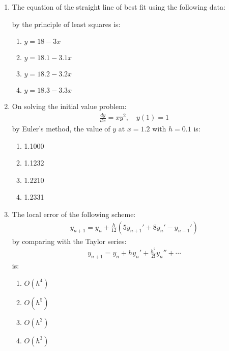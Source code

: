 \documentclass[journal,12pt,onecolumn]{IEEEtran}
\theoremstyle{remark}
\begin{document}
\begin{enumerate}
    \item The equation of the straight line of best fit using the following data:
    \begin{table}[h!]    
    \centering
    
    \end{table}
    by the principle of least squares is:
 \begin{multicols}{4}
    \begin{enumerate}
        \item $y = 18 - 3x$
        \item $y = 18.1 - 3.1x$
        \item $y = 18.2 - 3.2x$
        \item $y = 18.3 - 3.3x$
    \end{enumerate}
    \end{multicols}
    \item On solving the initial value problem:
    \begin{align}
    \frac{dy}{dx} = xy^2, \quad y(1) = 1
    \end{align}    
    by Euler's method, the value of $y$ at $x = 1.2$ with $h = 0.1$ is:
    \begin{multicols}{4}
    \begin{enumerate}
        \item 1.1000
        \item 1.1232
        \item 1.2210
        \item 1.2331    
    \end{enumerate}
   \end{multicols}
    \item The local error of the following scheme:
   \begin{align}
    y_{n+1} = y_n + \frac{h}{12} \left( 5y_{n+1}' + 8y_n' - y_{n-1}' \right)
    \end{align}   
    by comparing with the Taylor series:
    \begin{align}
    y_{n+1} = y_n + hy_n' + \frac{h^2}{2!} y_n'' + \cdots
    \end{align}
    is:
    \begin{multicols}{4}
    \begin{enumerate}
        \item $O(h^4)$
        \item $O(h^5)$
        \item $O(h^2)$
        \item $O(h^3)$
    \end{enumerate}
    \end{multicols}


\end{enumerate}
\end{document}
